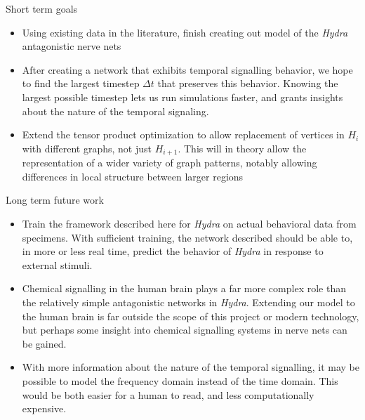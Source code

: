 \documentclass[leqno,presentation,unknownkeysallowed]{beamer}
\begin{document}
\begin{frame}{Short term goals}
\begin{itemize}
    \item Using existing data in the literature, finish creating out model of the \textit{Hydra} antagonistic nerve nets
    \item After creating a network that exhibits temporal signalling behavior, we hope to find the largest timestep $\Delta t$ that preserves this behavior. Knowing the largest possible timestep lets us run simulations faster, and grants insights about the nature of the temporal signaling.
    \item Extend the tensor product optimization to allow replacement of vertices in $H_i$ with different graphs, not just $H_{i+1}$. This will in theory allow the representation of a wider variety of graph patterns, notably allowing differences in local structure between larger regions
\end{itemize}
\end{frame}

\begin{frame}{Long term future work}
\begin{itemize}
    \item Train the framework described here for \textit{Hydra} on actual behavioral data from specimens. With sufficient training, the network described should be able to, in more or less real time, predict the behavior of \textit{Hydra} in response to external stimuli.
    \item Chemical signalling in the human brain plays a far more complex role than the relatively simple antagonistic networks in \textit{Hydra}. Extending our model to the human brain is far outside the scope of this project or modern technology, but perhaps some insight into chemical signalling systems in nerve nets can be gained.
    \item With more information about the nature of the temporal signalling, it may be possible to model the frequency domain instead of the time domain. This would be both easier for a human to read, and less computationally expensive.
\end{itemize}
\end{frame}

\end{document}
